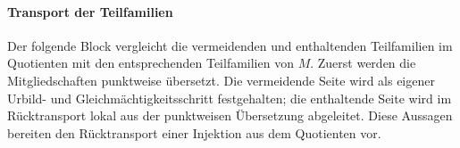 \documentclass[main.tex]{subfiles}
\begin{document}
\begin{tabproofsplitwide}
  \closeproofpartwide
\end{tabproofsplitwide}

\paragraph{Transport der Teilfamilien}

Der folgende Block vergleicht die vermeidenden und enthaltenden Teilfamilien im
Quotienten mit den entsprechenden Teilfamilien von \(M\). Zuerst werden die
Mitgliedschaften punktweise übersetzt. Die vermeidende Seite wird als eigener
Urbild- und Gleichmächtigkeitsschritt festgehalten; die enthaltende Seite wird
im Rücktransport lokal aus der punktweisen Übersetzung abgeleitet. Diese
Aussagen bereiten den Rücktransport einer Injektion aus dem Quotienten vor.

\begin{tabproof}
\end{tabproof}
\end{document}
